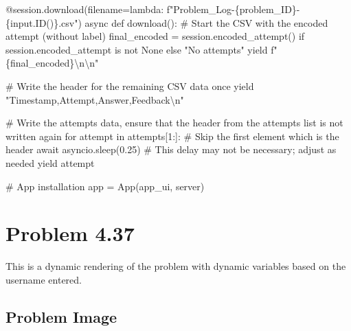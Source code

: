 \documentclass[
  letterpaper,
  DIV=11,
  numbers=noendperiod]{scrreprt}
\newenvironment{Shaded}{\begin{snugshade}}{\end{snugshade}}
\newcommand{\NormalTok}[1]{\textcolor[rgb]{0.00,0.23,0.31}{#1}}
\begin{document}
\begin{Shaded}
\begin{Highlighting}[]
\NormalTok{    @session.download(filename=lambda: f"Problem\_Log{-}\{problem\_ID\}{-}\{input.ID()\}.csv")}
\NormalTok{    async def download():}
\NormalTok{        \# Start the CSV with the encoded attempt (without label)}
\NormalTok{        final\_encoded = session.encoded\_attempt() if session.encoded\_attempt is not None else "No attempts"}
\NormalTok{        yield f"\{final\_encoded\}\textbackslash{}n\textbackslash{}n"}
        
\NormalTok{        \# Write the header for the remaining CSV data once}
\NormalTok{        yield "Timestamp,Attempt,Answer,Feedback\textbackslash{}n"}
        
\NormalTok{        \# Write the attempts data, ensure that the header from the attempts list is not written again}
\NormalTok{        for attempt in attempts[1:]:  \# Skip the first element which is the header}
\NormalTok{            await asyncio.sleep(0.25)  \# This delay may not be necessary; adjust as needed}
\NormalTok{            yield attempt}


\NormalTok{\# App installation}
\NormalTok{app = App(app\_ui, server)}
\end{Highlighting}
\end{Shaded}

\chapter*{Problem 4.37}\label{problem-4.37-2}


This is a dynamic rendering of the problem with dynamic variables based
on the username entered.

\section*{Problem Image}\label{problem-image-40}

\end{document}

